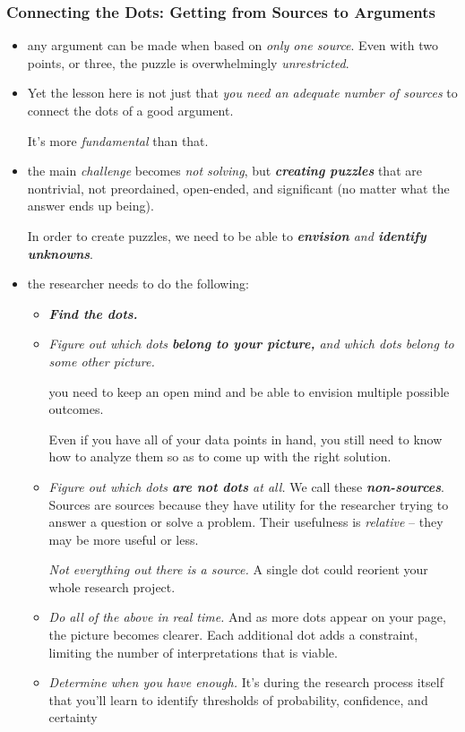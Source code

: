 \documentclass[11pt]{article}
\begin{document}
\subsubsection{Connecting the Dots: Getting from Sources to Arguments}
\begin{itemize}
\item any argument can be made when based on \emph{only one source}. Even with two points, or three, the puzzle is overwhelmingly \emph{unrestricted}.

\item Yet the lesson here is not just that \emph{you need an adequate number of sources} to connect the dots of a good argument.

It’s more \emph{fundamental} than that.

\item the main \emph{challenge} becomes \emph{not solving}, but \emph{\textbf{creating puzzles}} that are nontrivial, not preordained, open-ended, and significant (no matter what the answer ends up being). 

In order to create puzzles, we need to be able to \emph{\textbf{envision} and \textbf{identify unknowns}}.

\item the researcher needs to do the following:
\begin{itemize}
\item \emph{\textbf{Find the dots.}}
 
\item \emph{Figure out which dots \textbf{belong to your picture,} and which dots belong to some other picture.} 

you need to keep an open mind and be able to envision multiple possible outcomes. 

Even if you have all of your data points in hand, you still need to know how to analyze them so as to come up with the right solution.

\item \emph{Figure out which dots \textbf{are not dots} at all.} We call these \emph{\textbf{non-sources}}. Sources are sources because they have utility for the researcher trying to answer a question or solve a problem. Their usefulness is \emph{relative} -- they may be more useful or less. 

\emph{Not everything out there is a source.} A single dot could reorient your whole research project.

\item \emph{Do all of the above in real time.}  And as more dots appear on your page, the picture becomes clearer. Each additional dot adds a constraint, limiting the number of interpretations that is viable. 

\item \emph{Determine when you have enough.} It’s during the research process itself that you’ll learn to identify thresholds of probability, confidence, and certainty
\end{itemize}
\end{itemize}
\end{document}
